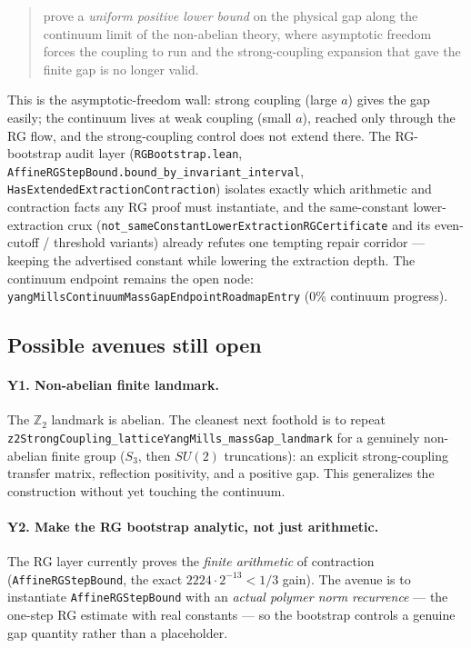 \begin{quote}
prove a \emph{uniform positive lower bound} on the physical gap along the
continuum limit of the non-abelian theory, where asymptotic freedom forces the
coupling to run and the strong-coupling expansion that gave the finite gap is no
longer valid.
\end{quote}

\noindent This is the asymptotic-freedom wall: strong coupling (large $a$) gives
the gap easily; the continuum lives at weak coupling (small $a$), reached only
through the RG flow, and the strong-coupling control does not extend there. The
RG-bootstrap audit layer (\verb|RGBootstrap.lean|,
\verb|AffineRGStepBound.bound_by_invariant_interval|,
\verb|HasExtendedExtractionContraction|) isolates exactly which arithmetic and
contraction facts any RG proof must instantiate, and the same-constant
lower-extraction crux (\verb|not_sameConstantLowerExtractionRGCertificate| and
its even-cutoff / threshold variants) already refutes one tempting repair
corridor --- keeping the advertised constant while lowering the extraction depth.
The continuum endpoint remains the open node:
\verb|yangMillsContinuumMassGapEndpointRoadmapEntry| (0\% continuum progress).

\subsection{Possible avenues still open}

\paragraph{Y1. Non-abelian finite landmark.} The $\mathbb{Z}_2$ landmark is
abelian. The cleanest next foothold is to repeat
\verb|z2StrongCoupling_latticeYangMills_massGap_landmark| for a genuinely
non-abelian finite group ($S_3$, then $SU(2)$ truncations): an explicit
strong-coupling transfer matrix, reflection positivity, and a positive gap.
This generalizes the construction without yet touching the continuum.

\paragraph{Y2. Make the RG bootstrap analytic, not just arithmetic.} The RG
layer currently proves the \emph{finite arithmetic} of contraction
(\verb|AffineRGStepBound|, the exact $2224\cdot2^{-13}<1/3$ gain). The avenue is
to instantiate \verb|AffineRGStepBound| with an \emph{actual polymer norm
recurrence} --- the one-step RG estimate with real constants --- so the
bootstrap controls a genuine gap quantity rather than a placeholder.

